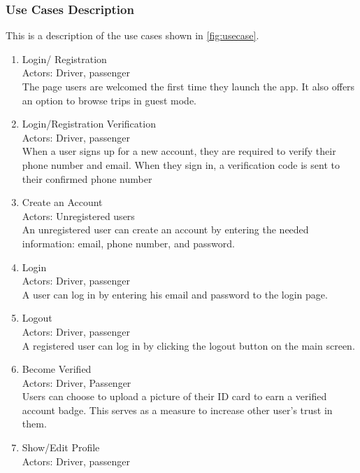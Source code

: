 \documentclass[a4paper, 12pt]{article} %
\begin{document}
        \subsubsection{Use Cases Description}
            This is a description of the use cases shown in \ref{fig:usecase}.
            \begin{enumerate}
                \item Login/ Registration \\
                    Actors: Driver, passenger \\
                    The page users are welcomed the first time they launch the app. It also offers an option to browse trips in guest mode.
                \item Login/Registration Verification\\            
                    Actors: Driver, passenger\\
                    When a user signs up for a new account, they are required to verify their phone number and email. When they sign in, a verification code is sent to their confirmed phone number
                \item Create an Account \\
                    Actors: Unregistered users\\
                    An unregistered user can create an account by entering the needed information: email, phone number, and password.
                \item Login \\
                    Actors: Driver, passenger\\
                    A user can log in by entering his email and password to the login page.
                \item Logout\\
                    Actors: Driver, passenger\\
                    A registered user can log in by clicking the logout button on the main screen.
                \item Become Verified \\
                    Actors: Driver, Passenger\\                
                    Users can choose to upload a picture of their ID card to earn a verified account badge. This serves as a measure to increase other user's trust in them. 
                \item Show/Edit Profile \\
                    Actors: Driver, passenger \\

\end{enumerate}
\end{document}
